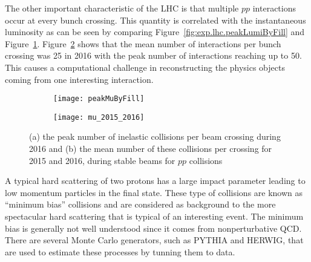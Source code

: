 The other important characteristic of the LHC is that multiple $pp$ interactions occur at every 
bunch crossing.  This quantity is correlated with the instantaneous luminosity as can be seen 
by comparing Figure~\ref{fig:exp.lhc.peakLumiByFill} and Figure~\ref{fig:exp.lhc.peakMuByFill}. Figure~\ref{fig:exp.mu_2015_2016}
shows that the mean number of interactions per bunch crossing was 25 in 2016 with the peak number of interactions 
reaching up to 50. This causes a computational challenge in reconstructing the physics objects coming from 
one interesting interaction.
\begin{figure}[!htb]
\centering
\begin{subfigure}[t]{0.48\textwidth}
\texttt{[image: peakMuByFill]}
\subcaption{}
\label{fig:exp.lhc.peakMuByFill}
\end{subfigure}
\begin{subfigure}[t]{0.48\textwidth}
\texttt{[image: mu\_2015\_2016]}
\subcaption{}
\label{fig:exp.mu_2015_2016}
\end{subfigure}
\vspace{-0.25cm}
\caption{(a) the peak number of inelastic collisions per beam crossing during 2016 
  and (b) the mean number of these collisions per crossing for 2015 and 2016, during stable beams for $pp$ collisions}
\label{fig:exp.lhc.int}
\end{figure} 
A typical hard scattering of two protons has a large impact parameter leading to low momentum particles in the final 
state. These type of collisions are known as ``minimum bias'' collisions and are considered as background to 
the more spectacular hard scattering that is typical of an interesting event. 
The minimum bias is generally not well understood since it comes from nonperturbative QCD. There are several Monte Carlo generators, such as {\sc PYTHIA} and
{\sc HERWIG}, that are used to estimate these processes by tunning them to 
data.


